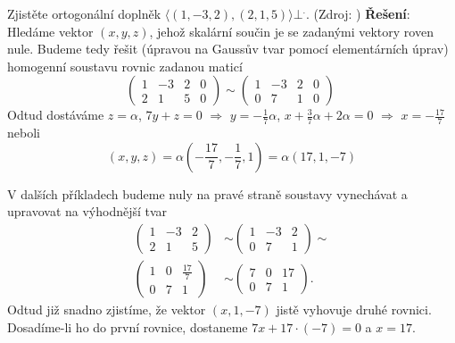 
\begin{example}\label{mai:exam011}
  Zjistěte ortogonální doplněk \(\langle(1,-3,2),(2,1,5)\rangle\bot^.\). (Zdroj:
  \cite[s.~3]{MosnaMA3})
  \newline\textbf{Řešení}:
  Hledáme vektor \((x, y, z)\), jehož skalární součin je se zadanými vektory roven nule. Budeme 
  tedy řešit (úpravou na Gaussův tvar pomocí elementárních úprav) homogenní soustavu rovnic
  zadanou maticí
  \begin{equation*}
     \left(
       \begin{array}{ccc|c}
          1  &  -3  & 2 & 0 \\
          2  &   1  & 5 & 0
       \end{array}
     \right)\sim
     \left(
       \begin{array}{ccc|c}
          1  &  -3  & 2 & 0 \\
          0  &   7  & 1 & 0
       \end{array}
     \right)\
  \end{equation*}
  Odtud dostáváme \(z = \alpha\), \(7y + z = 0\) \(\Rightarrow\) \(y = -\frac{1}{7}\alpha\), \(x
  +\frac{3}{7}\alpha + 2\alpha = 0\) \(\Rightarrow\) \(x = -\frac{17}{7}\) neboli 
  \begin{equation*}
  (x, y, z) =\alpha\left(-\frac{17}{7}, -\frac{1}{7}, 1\right) = \alpha(17, 1, -7)
  \end{equation*}

  V dalších příkladech budeme nuly na pravé straně soustavy vynechávat a upravovat na
  výhodnější tvar
  \begin{align*}
       \begin{pmatrix}
          1  &  -3  & 2  \\
          2  &   1  & 5
       \end{pmatrix}
       & \sim
       \begin{pmatrix}
          1  &  -3  & 2 \\
          0  &   7  & 1
       \end{pmatrix}
       \sim                         \\
       \begin{pmatrix}
          1  &   0  & \frac{17}{7}  \\
          0  &   7  & 1
       \end{pmatrix}
       & \sim
       \begin{pmatrix}
          7  &   0  & 17 \\
          0  &   7  & 1
       \end{pmatrix}.
  \end{align*}
  Odtud již snadno zjistíme, že vektor \((x, 1, -7)\) jistě vyhovuje druhé rovnici. Dosadíme-li ho 
  do první rovnice, dostaneme \(7x + 17\cdot(-7) = 0\) a \(x = 17\).


\end{example}
